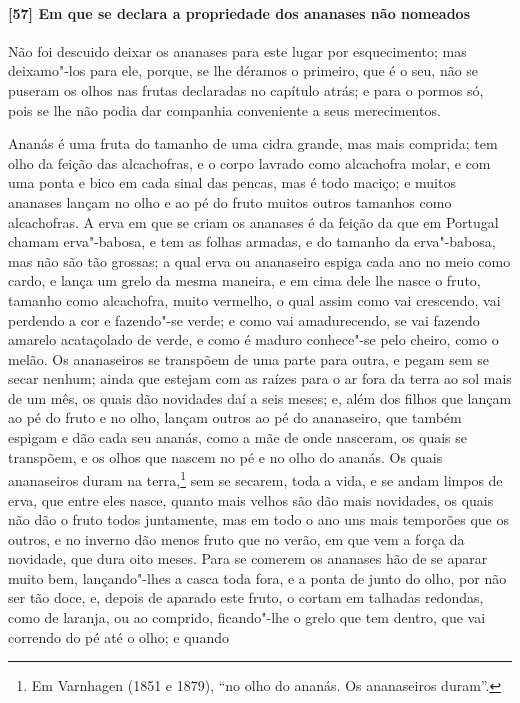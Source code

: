 \paragraph{[57] Em que se declara a propriedade dos ananases não nomeados}\quad
Não foi descuido deixar os ananases para este lugar por esquecimento; mas deixamo"-los para
ele, porque, se lhe déramos o primeiro, que é o seu, não se puseram os olhos nas frutas
declaradas no capítulo atrás; e para o pormos só, pois se lhe não podia dar companhia
conveniente a seus merecimentos.

Ananás é uma fruta do tamanho de uma cidra grande, mas mais comprida; tem olho da feição
das alcachofras, e o corpo lavrado como alcachofra molar, e com uma ponta e bico em cada
sinal das pencas, mas é todo maciço; e muitos ananases lançam no olho e ao pé do fruto
muitos outros tamanhos como alcachofras. A erva em que se criam os ananases é da feição da
que em Portugal chamam erva"-babosa, e tem as folhas armadas, e do tamanho da erva"-babosa,
mas não são tão grossas; a qual erva ou ananaseiro espiga cada ano no meio como cardo, e
lança um grelo da mesma maneira, e em cima dele lhe nasce o fruto, tamanho como
alcachofra, muito vermelho, o qual assim como vai crescendo, vai perdendo a cor e
fazendo"-se verde; e como vai amadurecendo, se vai fazendo amarelo acataçolado de verde, e
como é maduro conhece"-se pelo cheiro, como o melão. Os ananaseiros se transpõem de uma
parte para outra, e pegam sem se secar nenhum; ainda que estejam com as raízes para o ar
fora da terra ao sol mais de um mês, os quais dão novidades daí a seis meses; e, além dos
filhos que lançam ao pé do fruto e no olho, lançam outros ao pé do ananaseiro, que também
espigam e dão cada seu ananás, como a mãe de onde nasceram, os quais se transpõem, e os
olhos que nascem no pé e no olho do ananás. Os quais ananaseiros duram na terra,\footnote{
Em Varnhagen (1851 e 1879), ``no olho do ananás. Os ananaseiros duram''.} sem se secarem,
toda a vida, e se andam limpos de erva, que entre eles nasce, quanto mais velhos são dão
mais novidades, os quais não dão o fruto todos juntamente, mas em todo o ano uns mais
temporões que os outros, e no inverno dão menos fruto que no verão, em que vem a força da
novidade, que dura oito meses. Para se comerem os ananases hão de se aparar muito bem,
lançando"-lhes a casca toda fora, e a ponta de junto do olho, por não ser tão doce, e,
depois de aparado este fruto, o cortam em talhadas redondas, como de laranja, ou ao
comprido, ficando"-lhe o grelo que tem dentro, que vai correndo do pé até o olho; e quando
